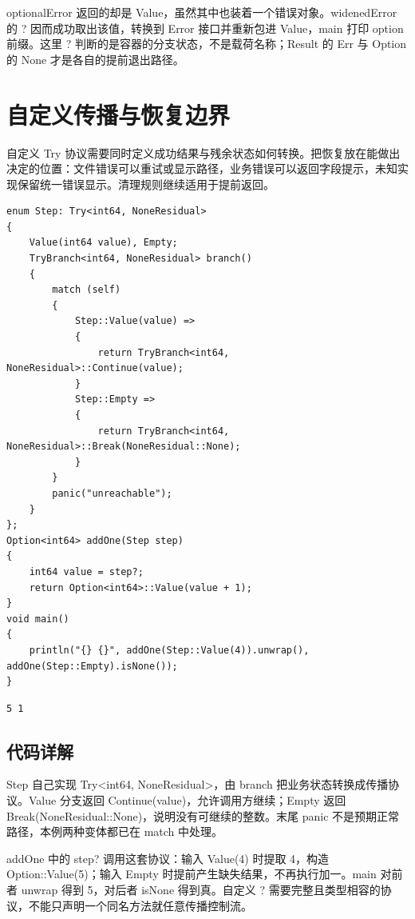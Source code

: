 optionalError 返回的却是 Value，虽然其中也装着一个错误对象。widenedError 的 ? 因而成功取出该值，转换到 Error 接口并重新包进 Value，main 打印 option 前缀。这里 ? 判断的是容器的分支状态，不是载荷名称；Result 的 Err 与 Option 的 None 才是各自的提前退出路径。

\section{自定义传播与恢复边界}

自定义 Try 协议需要同时定义成功结果与残余状态如何转换。把恢复放在能做出决定的位置：文件错误可以重试或显示路径，业务错误可以返回字段提示，未知实现保留统一错误显示。清理规则继续适用于提前返回。

\par
\medskip
\begin{lstlisting}[style=chali]
enum Step: Try<int64, NoneResidual>
{
    Value(int64 value), Empty;
    TryBranch<int64, NoneResidual> branch()
    {
        match (self)
        {
            Step::Value(value) =>
            {
                return TryBranch<int64, NoneResidual>::Continue(value);
            }
            Step::Empty =>
            {
                return TryBranch<int64, NoneResidual>::Break(NoneResidual::None);
            }
        }
        panic("unreachable");
    }
};
Option<int64> addOne(Step step)
{
    int64 value = step?;
    return Option<int64>::Value(value + 1);
}
void main()
{
    println("{} {}", addOne(Step::Value(4)).unwrap(), addOne(Step::Empty).isNone());
}
\end{lstlisting}
\par
\medskip

\par
\medskip
\begin{lstlisting}[style=out]
5 1
\end{lstlisting}
\par
\medskip

\subsection*{代码详解}

Step 自己实现 Try<int64, NoneResidual>，由 branch 把业务状态转换成传播协议。Value 分支返回 Continue(value)，允许调用方继续；Empty 返回 Break(NoneResidual::None)，说明没有可继续的整数。末尾 panic 不是预期正常路径，本例两种变体都已在 match 中处理。

addOne 中的 step? 调用这套协议：输入 Value(4) 时提取 4，构造 Option::Value(5)；输入 Empty 时提前产生缺失结果，不再执行加一。main 对前者 unwrap 得到 5，对后者 isNone 得到真。自定义 ? 需要完整且类型相容的协议，不能只声明一个同名方法就任意传播控制流。


